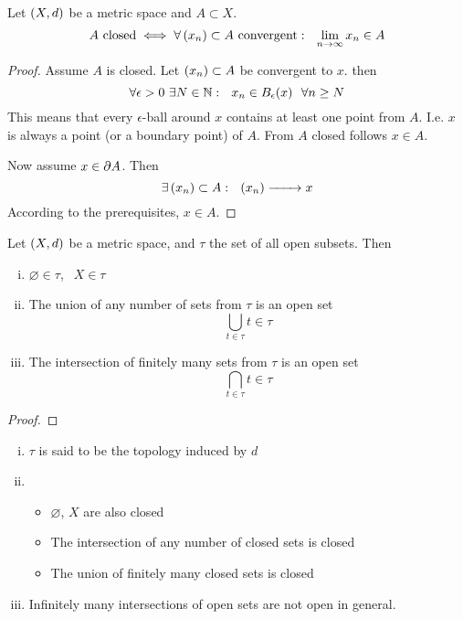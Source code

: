 \documentclass[../../script.tex] {subfiles}
\begin{document}
\begin{thm}
    Let $(X, d)$ be a metric space and $A \subset X$. 
    \[
        A \text{ closed} \iff \forall \left(x_n\right) \subset A \text{ convergent}: ~~\lim_{n \rightarrow \infty}{x_n} \in A
    \]
\end{thm}
\begin{proof}
    Assume $A$ is closed. Let $\left(x_n\right) \subset A$ be convergent to $x$. then
    \begin{equation}
        \forall \epsilon > 0 ~\exists N \in \mathbb{N}: ~~x_n \in B_{\epsilon}(x) ~~\forall n \ge N
    \end{equation}
    This means that every $\epsilon$-ball around $x$ contains at least one point from $A$.
    I.e. $x$ is always a point (or a boundary point) of $A$. From $A$ closed follows $x \in A$.

    Now assume $x \in \partial A$. Then 
    \begin{equation}
        \exists \anyseqdef{A}: ~~\seq{x} \conv{} x
    \end{equation}
    According to the prerequisites, $x \in A$.
\end{proof}

\begin{thm}
    Let $(X, d)$ be a metric space, and $\tau$ the set of all open subsets. Then 
    \begin{enumerate}[(i)]
        \item $\varnothing \in \tau$, $~~X \in \tau$
        \item The union of any number of sets from $\tau$ is an open set
        \[
            \bigcup_{t \in \tau} t \in \tau
        \]
        \item The intersection of finitely many sets from $\tau$ is an open set 
        \[
            \bigcap_{t \in \tau} t \in \tau
        \]
    \end{enumerate}
\end{thm}
\begin{proof}
    \reader
\end{proof}

\begin{rem}
    \begin{enumerate}[(i)]
        \item $\tau$ is said to be the topology induced by $d$
        \item \begin{itemize}
            \item $\varnothing$, $X$ are also closed 
            \item The intersection of any number of closed sets is closed 
            \item The union of finitely many closed sets is closed 
        \end{itemize}
        \item Infinitely many intersections of open sets are not open in general.
    \end{enumerate}
\end{rem}
\end{document}
